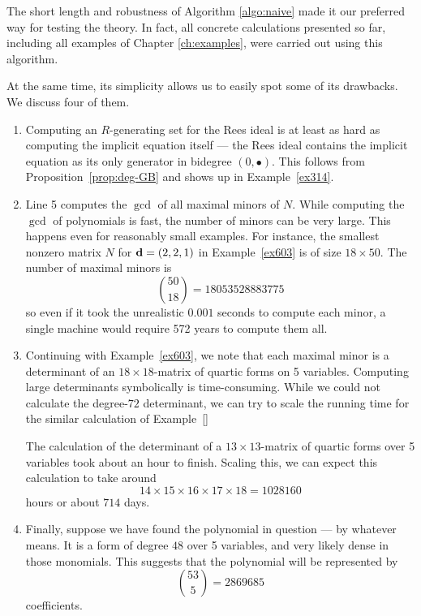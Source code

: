 \documentclass[fleqn,reqno]{amsart}
\numberwithin{first}{chapter}
\begin{document}
\begin{paragraf}
\label{par:flaws}
The short length and robustness of Algorithm \ref{algo:naive} made it our preferred way
for testing the theory.
In fact, all concrete calculations presented so far,
including all examples of Chapter \ref{ch:examples},
were carried out using this algorithm.

At the same time, its simplicity allows us to easily spot some of its drawbacks.
We discuss four of them.
\begin{enumerate}
\item
\label{itm:flaws:GB}
Computing an $R$-generating set for the Rees ideal is at least as hard as
computing the implicit equation itself ---
the Rees ideal contains the implicit equation as its only generator in bidegree $(0,\bullet)$.
This follows from Proposition~\ref{prop:deg-GB} and shows up in Example~\ref{ex314}.

\item
\label{itm:flaws:many-minors}
Line 5 computes the $\gcd$ of all maximal minors of $N$.
While computing the $\gcd$ of polynomials is fast,
the number of minors can be very large.
This happens even for reasonably small examples.
For instance, the smallest nonzero matrix $N$ for $\mathbf d=(2,2,1)$ in Example~\ref{ex603}
is of size $18\times50$.
The number of maximal minors is
\[
	\binom{50}{18}=18053528883775
\]
so even if it took the unrealistic $0.001$ seconds to compute each minor,
a single machine would require 572 years to compute them all.

\item
\label{itm:flaws:large-det}
Continuing with Example~\ref{ex603},
we note that each maximal minor is a determinant of an $18\times18$-matrix
of quartic forms on 5 variables.
Computing large determinants symbolically is time-consuming.
While we could not calculate the degree-$72$ determinant,
we can try to scale the running time for the similar calculation
of Example~\ref{}

The calculation of the determinant of a $13\times13$-matrix of quartic forms
over 5 variables took about an hour to finish.
Scaling this, we can expect this calculation to take around
\[
	14\times15\times16\times17\times18=1028160
\]
hours or about $714$ days.

\item
\label{itm:flaws:large-poly}
Finally, suppose we have found the polynomial in question --- by whatever means.
It is a form of degree $48$ over 5 variables, and very likely dense in those monomials.
This suggests that the polynomial will be represented by
\[
	\binom{53}{5}=2869685
\]
coefficients.
\end{enumerate}
\end{paragraf}
\end{document}
